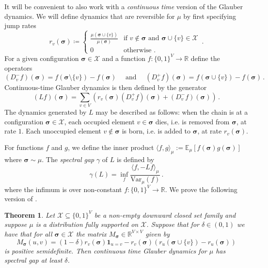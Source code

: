 \documentclass[10pt]{amsart}
\newtheorem{theorem}{Theorem}[section]
\newcommand{\one}{\boldsymbol{1}}
\newcommand{\E}{\mathbb{E}}
\newcommand{\R}{\mathbb{R}}
\newcommand{\sigmabf}{ \boldsymbol{\sigma} }
\newcommand{\rplus}[1]{ r_{#1}(\sigmabf) }
\begin{document}
	
	It will be convenient to also work with a \emph{continuous time} version of the Glauber dynamics. We will define dynamics that are reversible for $\mu$ by first specifying jump rates  
	$$
	\rplus{v} \coloneqq \begin{cases} \frac{\mu(\sigmabf \cup \{v\})}{\mu(\sigmabf)} & \text{if } v \notin \sigmabf \text{ and } \sigmabf \cup \{v\}  \in \mathcal{X} \\
		0 & \text{otherwise .}
	\end{cases} \,.
	$$
	For a given configuration $\sigmabf\in \mathcal{X}$ and a function $f:\{0,1\}^V \to \R$ define the operators
	$$
	(D^-_vf)(\sigmabf) = f(\sigmabf \setminus \{v\}) - f(\sigmabf) \quad \text{ and }\quad  (D^+_vf)(\sigmabf) = f(\sigmabf \cup \{v\}) - f(\sigmabf) \,.
	$$
	Continuous-time Glauber dynamics is then defined by the generator $$
	(Lf)(\sigmabf) = \sum_{v\in V} \left(r_v(\sigmabf) (D_{v}^+f)(\sigmabf) + (D_{v}^-f)(\sigmabf)\right) \,.
	$$ 
	The dynamics generated by $L$ may be described as follows: 
	when the chain is at a configuration
	$\sigmabf\in\mathcal X$, each occupied element $v\in \sigmabf$ dies, i.e. is removed from
	$\sigmabf$, at rate $1$.  Each unoccupied element $v\notin \sigmabf$ 
	is born, i.e. is added to $\sigmabf$, at rate
	$r_v(\sigmabf)$.
	
	
	For functions $f$ and $g$, we define the inner product $\langle f, g\rangle_\mu := \E_\mu[f(\sigmabf)g(\sigmabf)]$ where $\sigmabf \sim \mu$. The \emph{spectral gap} $\gamma$ of $L$ is defined by \begin{equation}\label{eq:spectral-gap-def}
		\gamma(L) = \inf_{f} \frac{\langle f, -Lf\rangle_\mu}{\text{Var}_\mu(f)}\,.
	\end{equation}
	where the infimum is over non-constant $f:\{0,1\}^V\to\mathbb{R}$.
	We prove the following version of \cite[Theorem~1.9]{chen2025rapid}.  
	\begin{theorem}\label{th:main}
		Let $\mathcal{X} \subseteq \{0,1\}^V$ be a non-empty downward closed set family and suppose $\mu$ is a distribution fully supported on $\mathcal{X}$.  Suppose that for $\delta \in (0,1)$ we have that for all $\sigmabf \in \mathcal{X}$ the matrix $M_{\sigmabf}\in \R^{V\times V}$ given by
		\begin{equation}\label{eq:PSD-assumption}
			M_{\sigmabf}(u,v)=(1 - \delta)r_v(\sigmabf)\one_{u = v} - r_v(\sigmabf)(r_u(\sigmabf\cup \{v\}) - r_u(\sigmabf))  
		\end{equation}
		is positive semidefinite. Then continuous time Glauber dynamics for $\mu$ has spectral gap at least $\delta$.
	\end{theorem}
	
\end{document}
